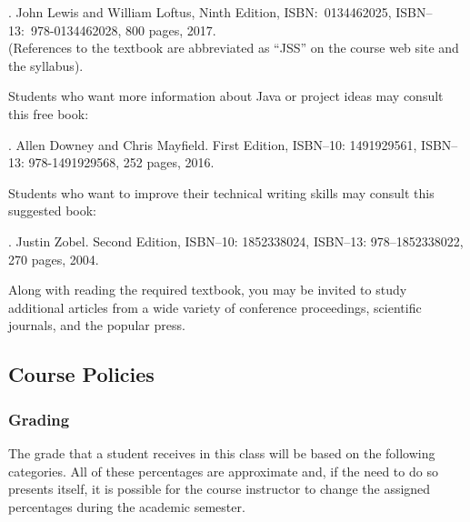 \documentclass[11pt]{article}
\begin{document}
. John
Lewis and William Loftus, Ninth Edition, ISBN:\ 0134462025, ISBN--13:\
978-0134462028, 800 pages, 2017. \\ (References to the textbook are abbreviated
as ``JSS'' on the course web site and the syllabus).

\vspace*{.1in}

\noindent Students who want more information about Java or project ideas may
consult this free book:

. Allen Downey
and Chris Mayfield. First Edition, ISBN--10: 1491929561, ISBN--13:
978-1491929568, 252 pages, 2016.

\vspace*{.1in}

\noindent Students who want to improve their technical writing skills may
consult this suggested book:

. Justin Zobel. Second Edition,
ISBN--10: 1852338024, ISBN--13: 978--1852338022, 270 pages, 2004.

\vspace*{.1in}

\noindent Along with reading the required textbook, you may be invited to study
additional articles from a wide variety of conference proceedings, scientific
journals, and the popular press.

\vspace*{-.05in}

\subsection*{Course Policies}

\subsubsection*{Grading}

The grade that a student receives in this class will be based on the following categories. All of these percentages are
approximate and, if the need to do so presents itself, it is possible for the course instructor to change the assigned
percentages during the academic semester.
\end{document}
